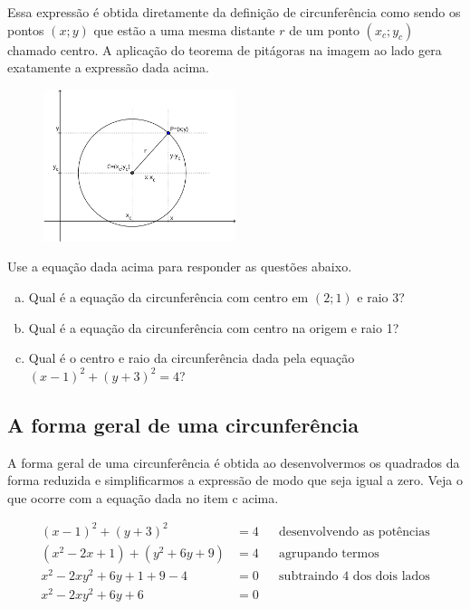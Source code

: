 \documentclass[main_estudante.tex]{subfiles}
\begin{document}
Essa expressão é obtida diretamente da definição de circunferência como sendo os pontos $(x;y)$ que estão a uma mesma distante $r$ de um ponto $(x_c;y_c)$ chamado centro. A aplicação do teorema de pitágoras na imagem ao lado gera exatamente a expressão dada acima.

\begin{figure}[h]
\centering
\includegraphics[width=0.5\textwidth]{./img/c6q12.png}
\end{figure}

\begin{questao}
Use a equação dada acima para responder as questões abaixo.
\begin{enumerate}[a)]
\item Qual é a equação da circunferência com centro em $(2;1)$ e raio 3? 
\item Qual é a equação da circunferência com centro na origem e raio 1?
\item Qual é o centro e raio da circunferência dada pela equação $(x-1)^2+(y+3)^2=4$?
\end{enumerate} 
\end{questao}

\subsection*{A forma geral de uma circunferência}

A forma geral de uma circunferência é obtida ao desenvolvermos os quadrados da forma reduzida e simplificarmos a expressão de modo que seja igual a zero. Veja o que ocorre com a equação dada no item c acima.

\begin{align*}
 (x-1)^2+(y+3)^2 &=4 && \text{desenvolvendo as potências}\\
 (x^2-2x+1)+(y^2+6y+9)&=4 && \text{agrupando termos}\\
 x^2-2xy^2+6y+1+9-4 &=0 && \text{subtraindo 4 dos dois lados}\\
 x^2-2xy^2+6y+6&=0
 \end{align*}
\end{document}
